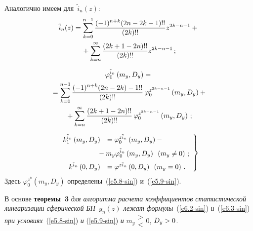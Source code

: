 \begin{multicols}{2}
Аналогично имеем для~$\tilde i_n (z)$:
 \begin{multline*}
 \tilde i_n (z) = \sss_{k=0}^{n-1}
    \fr{(-1)^{n+k}(2n- 2k-1)!!}{(2k)!!} z^{2k-n-1} + {}\\
    {}+
    \sss_{k=n}^\infty \fr{(2k+1-2n)!!}{(2k)!!} z^{2k-n-1}\,; %
    \end{multline*}
     
     \vspace*{-12pt}
     
\noindent
     \begin{multline}
     \varphi_0^{\tilde i_n} \left(m_y, D_y\right) = {}\\
     {}=
     \sum\limits_{k=0}^{n-1} \displaystyle\frac{\displaystyle (-1)^{n+k}(2n - 2k)-1!!\mathstrut}{\displaystyle (2k)!!\mathstrut}\,
     \varphi_0^{z^{2k-n-1}} \left(m_y, D_y\right)+{}\\
    {}+\sum\limits_{k=n}^\infty \displaystyle\frac{\displaystyle  (2k+1-2n)!!\mathstrut}{\displaystyle (2k)!!\mathstrut}\, \varphi_0^{z^{2k-n-1}} 
     \left(m_y, D_y\right)\,;\label{e6.5-sin}
     \end{multline}
     
     \vspace*{-12pt}
     
     \noindent
      \begin{equation}
      \left.
      \begin{array}{rl}
      k_1^{\tilde i_n}  \left(m_y, D_y\right) &= \varphi_0^{z\tilde i_n}  
      \left(m_y, D_y\right)-{}\\[6pt]
      &\hspace*{-5mm}{}- m_y  \varphi_0^{\tilde i_n}  \left(m_y, D_y\right)\enskip 
      \left(m_y \ne 0\right)\,;
     \\[6pt]
      k^{\tilde i_n} \left(0, D_y\right) &= \varphi^{z\tilde i_n} \left(0, D_y\right)\enskip 
      \left(m_y =0\right)\,.
      \end{array}
      \right\}
      \label{e6.6-sin}
      \end{equation}
Здесь $\varphi_0^{z^h} (m_y, D_y)$ определены~(\ref{e5.8-sin}) и~(\ref{e5.9-sin}).

\smallskip

В основе \textbf{теоремы~3} \textit{для алгоритма расчета коэффициентов статистической 
линеаризации сферической БН~$y_n (z)$ лежат формулы}~(\ref{e6.2-sin}) 
\textit{и}~(\ref{e6.3-sin}) \textit{при условиях}~(\ref{e5.8-sin}) \textit{и} 
(\ref{e5.9-sin}) \textit{и} $m_y \begin{matrix}
>\\ <\end{matrix} %
 0$, $D_y \hm>0$.
 

\end{multicols}
